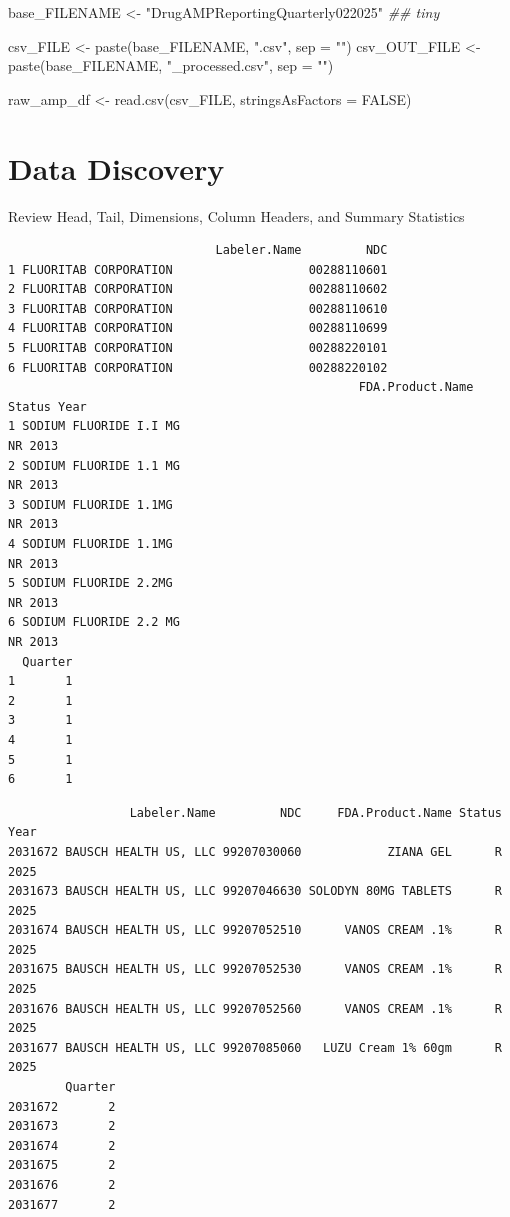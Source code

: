 \documentclass[
  letterpaper,
  DIV=11,
  numbers=noendperiod]{scrartcl}
\newenvironment{Shaded}{\begin{snugshade}}{\end{snugshade}}
\newcommand{\AttributeTok}[1]{\textcolor[rgb]{0.40,0.45,0.13}{#1}}
\newcommand{\ConstantTok}[1]{\textcolor[rgb]{0.56,0.35,0.01}{#1}}
\newcommand{\DocumentationTok}[1]{\textcolor[rgb]{0.37,0.37,0.37}{\textit{#1}}}
\newcommand{\FunctionTok}[1]{\textcolor[rgb]{0.28,0.35,0.67}{#1}}
\newcommand{\NormalTok}[1]{\textcolor[rgb]{0.00,0.23,0.31}{#1}}
\newcommand{\OtherTok}[1]{\textcolor[rgb]{0.00,0.23,0.31}{#1}}
\newcommand{\StringTok}[1]{\textcolor[rgb]{0.13,0.47,0.30}{#1}}
\begin{document}
\begin{Shaded}
\begin{Highlighting}[]
\NormalTok{base\_FILENAME }\OtherTok{\textless{}{-}} \StringTok{"DrugAMPReportingQuarterly022025"} \DocumentationTok{\#\# tiny}

\NormalTok{csv\_FILE }\OtherTok{\textless{}{-}} \FunctionTok{paste}\NormalTok{(base\_FILENAME, }\StringTok{".csv"}\NormalTok{, }\AttributeTok{sep =} \StringTok{""}\NormalTok{)}
\NormalTok{csv\_OUT\_FILE }\OtherTok{\textless{}{-}} \FunctionTok{paste}\NormalTok{(base\_FILENAME, }\StringTok{"\_processed.csv"}\NormalTok{, }\AttributeTok{sep =} \StringTok{""}\NormalTok{) }

\NormalTok{raw\_amp\_df }\OtherTok{\textless{}{-}} \FunctionTok{read.csv}\NormalTok{(csv\_FILE, }\AttributeTok{stringsAsFactors =} \ConstantTok{FALSE}\NormalTok{) }
\end{Highlighting}
\end{Shaded}

\section{Data Discovery}\label{data-discovery}

Review Head, Tail, Dimensions, Column Headers, and Summary Statistics

\begin{verbatim}
                             Labeler.Name         NDC
1 FLUORITAB CORPORATION                   00288110601
2 FLUORITAB CORPORATION                   00288110602
3 FLUORITAB CORPORATION                   00288110610
4 FLUORITAB CORPORATION                   00288110699
5 FLUORITAB CORPORATION                   00288220101
6 FLUORITAB CORPORATION                   00288220102
                                                 FDA.Product.Name Status Year
1 SODIUM FLUORIDE I.I MG                                              NR 2013
2 SODIUM FLUORIDE 1.1 MG                                              NR 2013
3 SODIUM FLUORIDE 1.1MG                                               NR 2013
4 SODIUM FLUORIDE 1.1MG                                               NR 2013
5 SODIUM FLUORIDE 2.2MG                                               NR 2013
6 SODIUM FLUORIDE 2.2 MG                                              NR 2013
  Quarter
1       1
2       1
3       1
4       1
5       1
6       1
\end{verbatim}

\begin{verbatim}
                 Labeler.Name         NDC     FDA.Product.Name Status Year
2031672 BAUSCH HEALTH US, LLC 99207030060            ZIANA GEL      R 2025
2031673 BAUSCH HEALTH US, LLC 99207046630 SOLODYN 80MG TABLETS      R 2025
2031674 BAUSCH HEALTH US, LLC 99207052510      VANOS CREAM .1%      R 2025
2031675 BAUSCH HEALTH US, LLC 99207052530      VANOS CREAM .1%      R 2025
2031676 BAUSCH HEALTH US, LLC 99207052560      VANOS CREAM .1%      R 2025
2031677 BAUSCH HEALTH US, LLC 99207085060   LUZU Cream 1% 60gm      R 2025
        Quarter
2031672       2
2031673       2
2031674       2
2031675       2
2031676       2
2031677       2
\end{verbatim}
\end{document}
